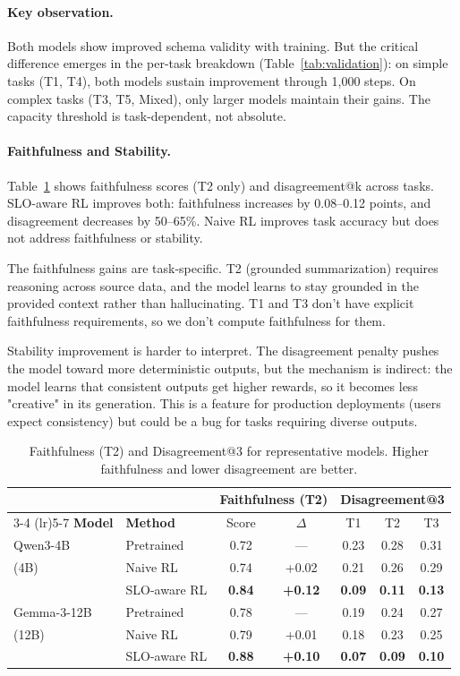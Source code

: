\documentclass[11pt]{article}
\begin{document}
\paragraph{Key observation.}
Both models show improved schema validity with training.  But the critical difference emerges in the per-task breakdown (Table~\ref{tab:validation}): on simple tasks (T1, T4), both models sustain improvement through 1{,}000 steps.  On complex tasks (T3, T5, Mixed), only larger models maintain their gains.  The capacity threshold is task-dependent, not absolute.

\paragraph{Faithfulness and Stability.}
Table~\ref{tab:faithfulness-stability} shows faithfulness scores (T2 only) and disagreement@k across tasks.
SLO-aware RL improves both: faithfulness increases by 0.08--0.12 points, and disagreement decreases by 50--65\%.
Naive RL improves task accuracy but does not address faithfulness or stability.

The faithfulness gains are task-specific.
T2 (grounded summarization) requires reasoning across source data, and the model learns to stay grounded in the provided context rather than hallucinating.
T1 and T3 don't have explicit faithfulness requirements, so we don't compute faithfulness for them.

Stability improvement is harder to interpret.
The disagreement penalty pushes the model toward more deterministic outputs, but the mechanism is indirect: the model learns that consistent outputs get higher rewards, so it becomes less "creative" in its generation.
This is a feature for production deployments (users expect consistency) but could be a bug for tasks requiring diverse outputs.

\begin{table}[t]
\centering
\caption{Faithfulness (T2) and Disagreement@3 for representative models.  Higher faithfulness and lower disagreement are better.}
\label{tab:faithfulness-stability}
\begin{tabular}{l l cc ccc}
\toprule
& & \multicolumn{2}{c}{\textbf{Faithfulness (T2)}} & \multicolumn{3}{c}{\textbf{Disagreement@3}} \\
\cmidrule(lr){3-4} \cmidrule(lr){5-7}
\textbf{Model} & \textbf{Method} & Score & $\Delta$ & T1 & T2 & T3 \\
\midrule
Qwen3-4B & Pretrained & 0.72 & --- & 0.23 & 0.28 & 0.31 \\
(4B) & Naive RL & 0.74 & +0.02 & 0.21 & 0.26 & 0.29 \\
& SLO-aware RL & \textbf{0.84} & \textbf{+0.12} & \textbf{0.09} & \textbf{0.11} & \textbf{0.13} \\
\midrule
Gemma-3-12B & Pretrained & 0.78 & --- & 0.19 & 0.24 & 0.27 \\
(12B) & Naive RL & 0.79 & +0.01 & 0.18 & 0.23 & 0.25 \\
& SLO-aware RL & \textbf{0.88} & \textbf{+0.10} & \textbf{0.07} & \textbf{0.09} & \textbf{0.10} \\
\bottomrule
\end{tabular}
\end{table}
\end{document}
